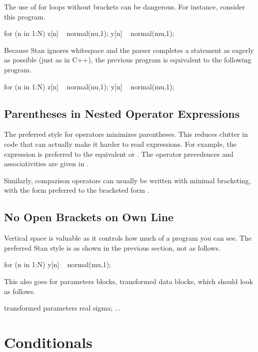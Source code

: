 The use of for loops without brackets can be dangerous.  For instance,
consider this program.
%
\begin{stancode}
for (n in 1:N)
  z[n] ~ normal(nu,1);
  y[n] ~ normal(mu,1);
\end{stancode}
%
Because Stan ignores whitespace and the parser completes a statement
as eagerly as possible (just as in C++), the previous program is
equivalent to the following program.
%
\begin{stancode}
for (n in 1:N) {
  z[n] ~ normal(nu,1);
}
y[n] ~ normal(mu,1);
\end{stancode}
%


\subsection{Parentheses in Nested Operator Expressions}

The preferred style for operators minimizes parentheses.  This reduces
clutter in code that can actually make it harder to read expressions.
For example, the expression  is preferred to the
equivalent  or .  The operator
precedences and associativities are given in
.

Similarly, comparison operators can usually be written with minimal
bracketing, with the form  preferred to
the bracketed form .  

\subsection{No Open Brackets on Own Line}

Vertical space is valuable as it controls how much of a program you
can see.  The preferred Stan style is as shown in the previous
section, not as follows.
%
\begin{stancode}
for (n in 1:N) 
{
  y[n] ~ normal(mu,1);
}
\end{stancode}
%
This also goes for parameters blocks, transformed data blocks, 
which should look as follows.
%
\begin{stancode}
transformed parameters {
  real sigma;
  ...
}
\end{stancode}
%


\section{Conditionals}

